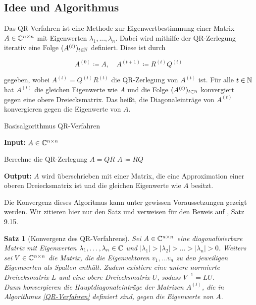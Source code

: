 \documentclass{article}
\theoremstyle{plain}
\newtheorem{theorem}    {Satz}   [section]
\begin{document}
\subsection{Idee und Algorithmus}

Das QR-Verfahren ist eine Methode zur Eigenwertbestimmung einer Matrix $A \in \mathbb{C}^{n \times n}$ mit Eigenwerten $\lambda_1, ..., \lambda_n$. Dabei wird mithilfe der QR-Zerlegung iterativ eine Folge $(A^{(t)})_{t \in \mathbb{N}}$ definiert. Diese ist durch

\begin{equation}
	A^{(0)} \coloneqq A, \quad A^{(t+1)} \coloneqq R^{(t)}Q^{(t)}
\end{equation}

gegeben, wobei $A^{(t)} = Q^{(t)} R^{(t)}$ die QR-Zerlegung von $A^{(t)}$ ist.
Für alle $t\in \mathbb{N}$ hat $A^{(t)}$ die gleichen Eigenwerte wie $A$ und die Folge $(A^{(t)})_{t \in \mathbb{N}}$ konvergiert gegen eine obere Dreiecksmatrix. Das heißt, die Diagonaleinträge von $A^{(t)}$ konvergieren gegen die Eigenwerte von $A$.

\renewcommand{\algorithmicrequire}{\textbf{Input:}}
\renewcommand{\algorithmicensure}{\textbf{Output:}}

\begin{algorithm}

	\caption{Basisalgorithmus QR-Verfahren}
	\label{QR-Verfahren}
	\algorithmicrequire{ $A \in \mathbb{C}^{n\times n}$}
	\begin{algorithmic}[1]
		\State Berechne die QR-Zerlegung $A = QR$
		\State $A \coloneqq RQ$
		\EndWhile
	\end{algorithmic}
	\algorithmicensure{ $A$ wird überschrieben mit einer Matrix, die eine Approximation einer oberen Dreiecksmatrix ist und die gleichen Eigenwerte wie $A$ besitzt.}
\end{algorithm}


Die Konvergenz dieses Algoritmus kann unter gewissen Voraussetzungen gezeigt werden. Wir zitieren hier nur den Satz und verweisen für den Beweis auf \cite{Num}, Satz 9.15.

\begin{theorem}[Konvergenz des QR-Verfahrens]
	\label{Konv_QR}
	Sei $A \in \mathbb{C}^{n\times n}$ eine diagonalisierbare Matrix mit Eigenwerten $\lambda_1,\dots,\lambda_n \in \mathbb{C}$ und $|\lambda_1| > |\lambda_2| > \dots > |\lambda_n| > 0$. Weiters sei $V \in \mathbb{C}^{n \times n}$ die Matrix, die die Eigenvektoren $v_1,\dots v_n$ zu den jeweiligen Eigenwerten als Spalten enthält. Zudem existiere eine untere normierte Dreiecksmatrix $L$ und eine obere Dreiecksmatrix $U$, sodass $V^{-1} = LU$.\\
	Dann konvergieren die Hauptdiagonaleinträge der Matrizen $A^{(t)}$, die in Algorithmus \ref{QR-Verfahren} definiert sind, gegen die Eigenwerte von $A$.
\end{theorem}
\end{document}
